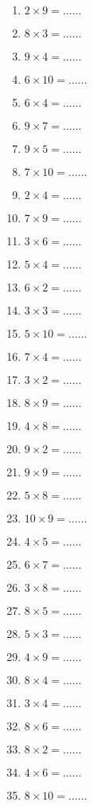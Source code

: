 \documentclass[11pt]{article}
\begin{document}
\begin{exercice}[1]
\begin{multicols}{5}
\begin{enumerate}[label=\arabic*)]
\item  $ 2\times 9 =\ldots\ldots$ 
\item  $ 8\times 3 =\ldots\ldots$ 
\item  $ 9\times 4 =\ldots\ldots$ 
\item  $ 6\times 10 =\ldots\ldots$ 
\item  $ 6\times 4 =\ldots\ldots$ 
\item  $ 9\times 7 =\ldots\ldots$ 
\item  $ 9\times 5 =\ldots\ldots$ 
\item  $ 7\times 10 =\ldots\ldots$ 
\item  $ 2\times 4 =\ldots\ldots$ 
\item  $ 7\times 9 =\ldots\ldots$ 
\item  $ 3\times 6 =\ldots\ldots$ 
\item  $ 5\times 4 =\ldots\ldots$ 
\item  $ 6\times 2 =\ldots\ldots$ 
\item  $ 3\times 3 =\ldots\ldots$ 
\item  $ 5\times 10 =\ldots\ldots$ 
\item  $ 7\times 4 =\ldots\ldots$ 
\item  $ 3\times 2 =\ldots\ldots$ 
\item  $ 8\times 9 =\ldots\ldots$ 
\item  $ 4\times 8 =\ldots\ldots$ 
\item  $ 9\times 2 =\ldots\ldots$ 
\item  $ 9\times 9 =\ldots\ldots$ 
\item  $ 5\times 8 =\ldots\ldots$ 
\item  $ 10\times 9 =\ldots\ldots$ 
\item  $ 4\times 5 =\ldots\ldots$ 
\item  $ 6\times 7 =\ldots\ldots$ 
\item  $ 3\times 8 =\ldots\ldots$ 
\item  $ 8\times 5 =\ldots\ldots$ 
\item  $ 5\times 3 =\ldots\ldots$ 
\item  $ 4\times 9 =\ldots\ldots$ 
\item  $ 8\times 4 =\ldots\ldots$ 
\item  $ 3\times 4 =\ldots\ldots$ 
\item  $ 8\times 6 =\ldots\ldots$ 
\item  $ 8\times 2 =\ldots\ldots$ 
\item  $ 4\times 6 =\ldots\ldots$ 
\item  $ 8\times 10 =\ldots\ldots$ 

\end{enumerate}
\end{multicols}
\end{exercice}
\end{document}
